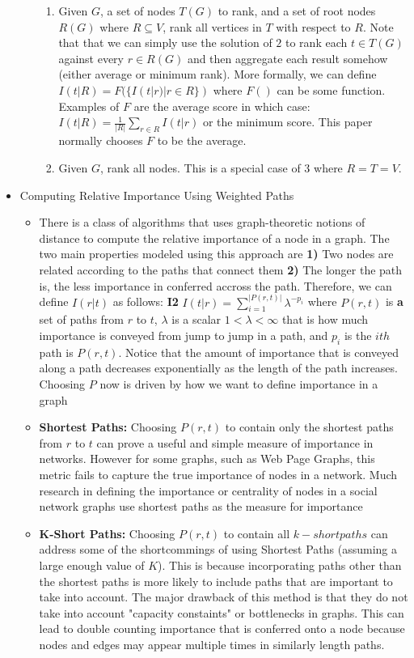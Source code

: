 \documentclass[a4paper]{article}
\begin{document}
\begin{itemize}
\begin{itemize}
\begin{enumerate}
\item Given $G$, a set of nodes $T(G)$ to rank, and a set of root nodes $R(G)$ where $R \subseteq V$, rank all vertices in $T$ with respect to $R$. Note that that we can simply use the solution of $2$ to rank each $t \in T(G)$ against every $r \in R(G)$ and then aggregate each result somehow (either average or minimum rank). More formally, we can define $I(t|R) = F(\{I(t|r) | r \in R\})$ where $F()$ can be some function. Examples of $F$ are the average score in which case: $I(t|R) = \frac{1}{|R|}\sum_{r \in R}I(t|r)$ or the minimum score. This paper normally chooses $F$ to be the average.

\item Given $G$, rank all nodes. This is a special case of $3$ where $R=T=V$. 
\end{enumerate}
\end{itemize}

\item Computing Relative Importance Using Weighted Paths
\begin{itemize}
\item There is a class of algorithms that uses graph-theoretic notions of distance to compute the relative importance of a node in a graph. The two main properties modeled using this approach are \textbf{1)} Two nodes are related according to the paths that connect them \textbf{2)} The longer the path is, the less importance in conferred accross the path. Therefore, we can define $I(r|t)$ as follows: \textbf{I2} $I(t|r) = \sum_{i = 1}^{|P(r,t)|} \lambda^{-p_i}$ where $P(r,t)$ is \textbf{a} set of paths from $r$ to $t$, $\lambda$ is a scalar $1 < \lambda < \infty$ that is how much importance is conveyed from jump to jump in a path, and $p_i$ is the $ith$ path is $P(r, t)$. Notice that the amount of importance that is conveyed along a path decreases exponentially as the length of the path increases. Choosing $P$ now is driven by how we want to define importance in a graph

\item \textbf{Shortest Paths:} Choosing $P(r, t)$ to contain only the shortest paths from $r$ to $t$ can prove a useful and simple measure of importance in networks. However for some graphs, such as Web Page Graphs, this metric fails to capture the true importance of nodes in a network. Much research in defining the importance or centrality of nodes in a social network graphs use shortest paths as the measure for importance

\item \textbf{K-Short Paths:} Choosing $P(r,t)$ to contain all $k-short paths$ can address some of the shortcommings of using Shortest Paths (assuming a large enough value of $K$). This is because incorporating paths other than the shortest paths is more likely to include paths that are important to take into account. The major drawback of this method is that they do not take into account "capacity constaints" or bottlenecks in graphs. This can lead to double counting importance that is conferred onto a node because nodes and edges may appear multiple times in similarly length paths.


\end{itemize}
\end{itemize}
\end{document}
